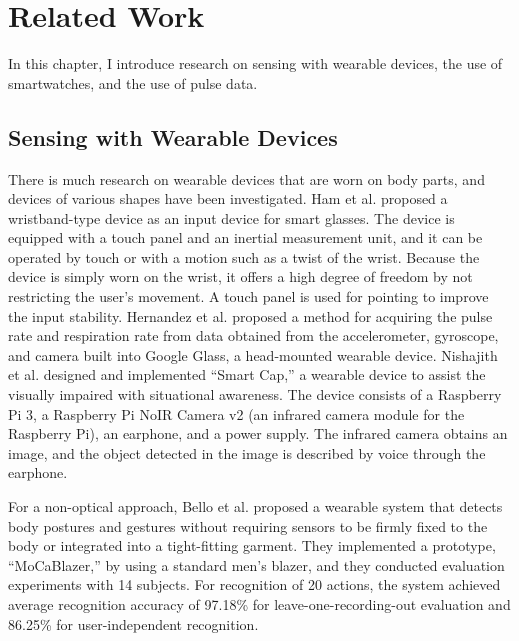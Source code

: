 \chapter{Related Work}
\label{sec:related}
In this chapter, I introduce research on sensing with wearable devices, the use of smartwatches, and the use of pulse data.

\section{Sensing with Wearable Devices}
There is much research on wearable devices that are worn on body parts, and devices of various shapes have been investigated. Ham et al. \cite{smart_wristband} proposed a wristband-type device as an input device for smart glasses. The device is equipped with a touch panel and an inertial measurement unit, and it can be operated by touch or with a motion such as a twist of the wrist. Because the device is simply worn on the wrist, it offers a high degree of freedom by not restricting the user's movement. A touch panel is used for pointing to improve the input stability. Hernandez et al. \cite{bioglass} proposed a method for acquiring the pulse rate and respiration rate from data obtained from the accelerometer, gyroscope, and camera built into Google Glass, a head-mounted wearable device. Nishajith et al. \cite{smart_cap} designed and implemented ``Smart Cap,'' a wearable device to assist the visually impaired with situational awareness. The device consists of a Raspberry Pi 3, a Raspberry Pi NoIR Camera v2 (an infrared camera module for the Raspberry Pi), an earphone, and a power supply. The infrared camera obtains an image, and the object detected in the image is described by voice through the earphone.\par

For a non-optical approach, Bello et al. \cite{MoCapaci} proposed a wearable system that detects body postures and gestures without requiring sensors to be firmly fixed to the body or integrated into a tight-fitting garment. They implemented a prototype, ``MoCaBlazer,'' by using a standard men's blazer, and they conducted evaluation experiments with 14 subjects. For recognition of 20 actions, the system achieved average recognition accuracy of 97.18\% for leave-one-recording-out evaluation and 86.25\% for user-independent recognition.\par

